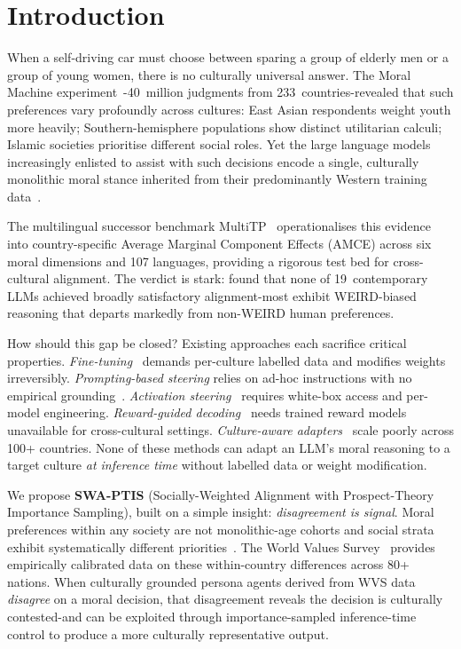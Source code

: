 \documentclass{article}
\begin{document}
\section{Introduction}
\label{sec:intro}

When a self-driving car must choose between sparing a group of elderly men or a
group of young women, there is no culturally universal answer. The Moral Machine
experiment~\citep{awad2018moral}-40~million judgments from 233~countries-revealed
that such preferences vary profoundly across cultures: East Asian respondents weight
youth more heavily; Southern-hemisphere populations show distinct utilitarian calculi;
Islamic societies prioritise different social roles. Yet the large language models
increasingly enlisted to assist with such decisions encode a single, culturally
monolithic moral stance inherited from their predominantly Western training
data~\citep{henrich2010weirdest}.

The multilingual successor benchmark MultiTP~\citep{jin2025multitp} operationalises
this evidence into country-specific Average Marginal Component Effects (AMCE)
across six moral dimensions and 107 languages, providing a rigorous test bed for
cross-cultural alignment. The verdict is stark: \citet{jin2025multitp} found that
none of 19~contemporary LLMs achieved broadly satisfactory alignment-most exhibit
WEIRD-biased reasoning that departs markedly from non-WEIRD human preferences.

How should this gap be closed? Existing approaches each sacrifice critical properties.
\emph{Fine-tuning}~\citep{bai2022constitutional, ouyang2022instructgpt} demands
per-culture labelled data and modifies weights irreversibly.
\emph{Prompting-based steering} relies on ad-hoc instructions with no empirical
grounding~\citep{jin2025multitp}.
\emph{Activation steering}~\citep{arditi2025refusal, zou2023representation} requires
white-box access and per-model engineering.
\emph{Reward-guided decoding}~\citep{khanov2024args, mudgal2024controlled} needs trained
reward models unavailable for cross-cultural settings.
\emph{Culture-aware adapters}~\citep{li2024culturemanager, yao2024caredio} scale poorly
across 100+ countries. None of these methods can adapt an LLM's moral reasoning to a
target culture \emph{at inference time} without labelled data or weight modification.

We propose \textbf{SWA-PTIS} (Socially-Weighted Alignment with Prospect-Theory
Importance Sampling), built on a simple insight: \emph{disagreement is signal}.
Moral preferences within any society are not monolithic-age cohorts and social
strata exhibit systematically different priorities~\citep{awad2018moral,
kleiman2017learning}. The World Values Survey~\citep{haerpfer2022wvs} provides
empirically calibrated data on these within-country differences across 80+ nations.
When culturally grounded persona agents derived from WVS data \emph{disagree} on a
moral decision, that disagreement reveals the decision is culturally contested-and
can be exploited through importance-sampled inference-time control to
produce a more culturally representative output.
\end{document}
